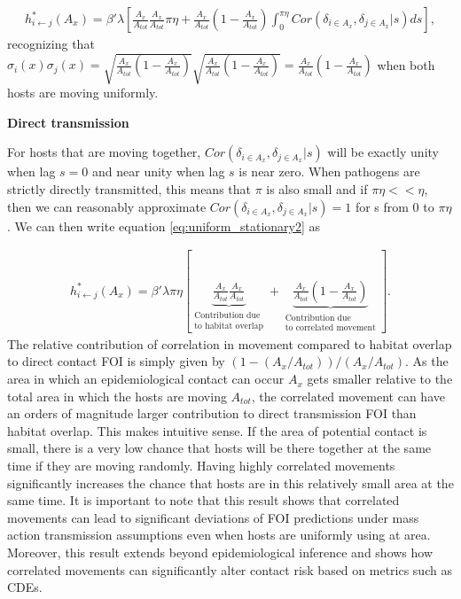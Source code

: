 \documentclass[letterpaper]{article}
\begin{document}
\begin{equation}
    \begin{aligned}
        h^*_{i \leftarrow j}(A_x) = \beta' \lambda \left[\frac{A_x}{A_{tot}}\frac{A_x}{A_{tot}} \pi \eta + \frac{A_x}{A_{tot}}(1 - \frac{A_x}{A_{tot}}) \int_{0}^{\pi \eta} Cor(\delta_{i \in A_x}, \delta_{j \in A_x} | s) ds\right],
    \end{aligned}
    \label{eq:uniform_stationary2}
\end{equation}
recognizing that $\sigma_i(x) \sigma_j(x) = \sqrt{\frac{A_x}{A_{tot}}(1 - \frac{A_x}{A_{tot}})}\sqrt{\frac{A_x}{A_{tot}}(1 - \frac{A_x}{A_{tot}})} = \frac{A_x}{A_{tot}}(1 - \frac{A_x}{A_{tot}})$ when both hosts are moving uniformly.

\smallskip
\noindent
\textbf{Direct transmission}

For hosts that are moving together, $Cor(\delta_{i \in A_x}, \delta_{j \in A_x} | s)$ will be exactly unity when lag $s = 0$ and near unity when lag $s$ is near zero. When pathogens are strictly directly transmitted, this means that $\pi$ is also small and if $\pi \eta << \eta$, then we can reasonably approximate $Cor(\delta_{i \in A_x}, \delta_{j \in A_x} | s) = 1$ for s from 0 to $\pi \eta$.  We can then write equation \ref{eq:uniform_stationary2} as 

\begin{equation}
    \begin{aligned}
        h^*_{i \leftarrow j}(A_x) = \beta' \lambda \pi \eta \left[\underbrace{\frac{A_x}{A_{tot}}\frac{A_x}{A_{tot}}}_{\substack{\text{Contribution due} \\  \text{to habitat overlap}}} + \underbrace{\frac{A_x}{A_{tot}}(1 - \frac{A_x}{A_{tot}})}_{\substack{\text{Contribution due} \\ \text{to correlated movement}}} \right].
    \end{aligned}
    \label{eq:uniform_direct}
\end{equation}
The relative contribution of correlation in movement compared to habitat overlap to direct contact FOI is simply given by $(1 - (A_x / A_{tot})) / (A_x / A_{tot})$.  As the area in which an epidemiological contact can occur $A_x$ gets smaller relative to the total area in which the hosts are moving $A_{tot}$, the correlated movement can have an orders of magnitude larger contribution to direct transmission FOI than habitat overlap.  This makes intuitive sense.  If the area of potential contact is small, there is a very low chance that hosts will be there together at the same time if they are moving randomly.  Having highly correlated movements significantly increases the chance that hosts are in this relatively small area at the same time.  It is important to note that this result shows that correlated movements can lead to significant deviations of FOI predictions under mass action transmission assumptions even when hosts are uniformly using at area.  Moreover, this result extends beyond epidemiological inference and shows how correlated movements can significantly alter contact risk based on metrics such as CDEs.
\end{document}

